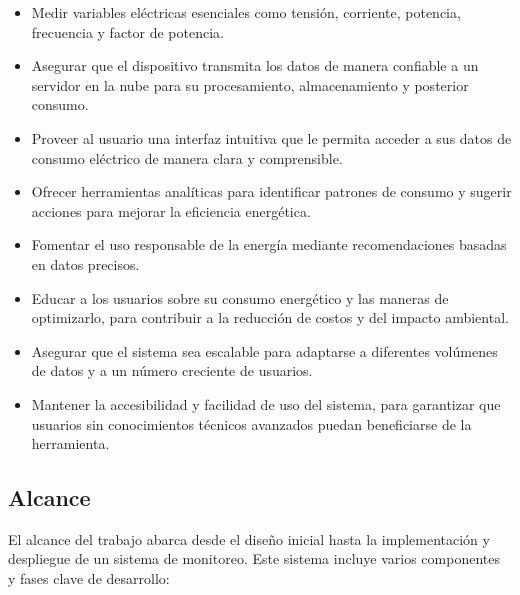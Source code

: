 \begin{itemize}
	\item Medir variables eléctricas esenciales como tensión, corriente, potencia, frecuencia y factor de potencia.
	
	\item Asegurar que el dispositivo transmita los datos de manera confiable a un servidor en la nube para su procesamiento, almacenamiento y posterior consumo.

	\item  Proveer al usuario una interfaz intuitiva que le permita acceder a sus datos de consumo eléctrico de manera clara y comprensible.

	\item Ofrecer herramientas analíticas para identificar patrones de consumo y sugerir acciones para mejorar la eficiencia energética. 
	
	\item Fomentar el uso responsable de la energía mediante recomendaciones basadas en datos precisos.
	
	\item Educar a los usuarios sobre su consumo energético y las maneras de optimizarlo, para contribuir a la reducción de costos y del impacto ambiental.
	
	\item Asegurar que el sistema sea escalable para adaptarse a diferentes volúmenes de datos y a un número creciente de usuarios.
	
	\item Mantener la accesibilidad y facilidad de uso del sistema, para garantizar que usuarios sin conocimientos técnicos avanzados puedan beneficiarse de la herramienta.
\end{itemize}

\subsection{Alcance}

El alcance del trabajo abarca desde el diseño inicial hasta la implementación y despliegue de un sistema de monitoreo. Este sistema incluye varios componentes y fases clave de desarrollo:


